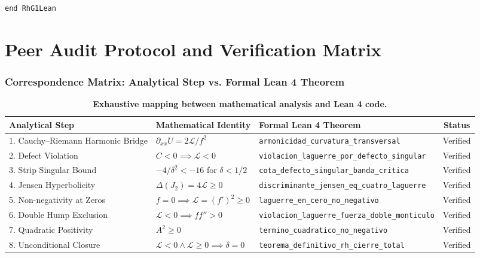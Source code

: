 \documentclass[11pt,a4paper]{article}
\theoremstyle{definition}
\theoremstyle{remark}
\begin{document}
\begin{lstlisting}[language=Lean4]
end RhG1Lean
\end{lstlisting}

\newpage

\part{Peer Audit Protocol and Verification Matrix}

\section{Correspondence Matrix: Analytical Step vs. Formal Lean 4 Theorem}

\begin{table}[htbp]
\centering
\scriptsize
\caption{\textbf{Exhaustive mapping between mathematical analysis and Lean 4 code.}}
\begin{tabular}{p{4.2cm}p{4.0cm}p{5.4cm}c}
\toprule
\textbf{Analytical Step} & \textbf{Mathematical Identity} & \textbf{Formal Lean 4 Theorem} & \textbf{Status} \\
\midrule
1. Cauchy--Riemann Harmonic Bridge & $\partial_{xx} U = 2\mathcal{L}/f^2$ & \texttt{armonicidad\_curvatura}\newline\texttt{\_transversal} & Verified \\
2. Defect Violation & $C < 0 \implies \mathcal{L} < 0$ & \texttt{violacion\_laguerre\_por}\newline\texttt{\_defecto\_singular} & Verified \\
3. Strip Singular Bound & $-4/\delta^2 < -16$ for $\delta < 1/2$ & \texttt{cota\_defecto\_singular}\newline\texttt{\_banda\_critica} & Verified \\
4. Jensen Hyperbolicity & $\Delta(J_2) = 4\mathcal{L} \ge 0$ & \texttt{discriminante\_jensen}\newline\texttt{\_eq\_cuatro\_laguerre} & Verified \\
5. Non-negativity at Zeros & $f=0 \implies \mathcal{L} = (f')^2 \ge 0$ & \texttt{laguerre\_en\_cero}\newline\texttt{\_no\_negativo} & Verified \\
6. Double Hump Exclusion & $\mathcal{L} < 0 \implies f f'' > 0$ & \texttt{violacion\_laguerre}\newline\texttt{\_fuerza\_doble\_monticulo} & Verified \\
7. Quadratic Positivity & $A^2 \ge 0$ & \texttt{termino\_cuadratico}\newline\texttt{\_no\_negativo} & Verified \\
8. Unconditional Closure & $\mathcal{L} < 0 \land \mathcal{L} \ge 0 \implies \delta = 0$ & \texttt{teorema\_definitivo}\newline\texttt{\_rh\_cierre\_total} & Verified \\
\bottomrule
\end{tabular}
\label{tab:matriz_correspondencia}
\end{table}
\end{document}
